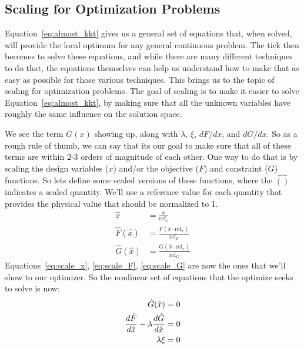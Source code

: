 \documentclass[conf]{new-aiaa}
\begin{document}
    \subsection{Scaling for Optimization Problems}

    Equation~\eqref{eq:almost_kkt} gives us a general set of equations that, when solved, will provide the local optimum for any general continuous problem. 
    The tick then becomes to solve these equations, and while there are many different techniques to do that, the equations themselves can help us understand how to make that as easy as possible for those various techniques. 
    This brings us to the topic of scaling for optimization problems. 
    The goal of {}scaling is to make it easier to solve Equation~\eqref{eq:almost_kkt}, by making sure that all the unknown variables have roughly the same influence on the solution space. 

    We see the term $G(x)$ showing up, along with $\lambda$, $\xi$, $dF/dx$, and $dG/dx$. 
    So as a rough rule of thumb, we can say that its our goal to make sure that all of these terms are within 2-3 orders of magnitude of each other. 
    One way to do that is by scaling the design variables ($x$) and/or the objective ($F$) and constraint ($G$) functions. 
    So lets define some scaled versions of these functions, where the $\hat{()}$ indicates a scaled quantity.
    We'll use a reference value for each quantity that provides the physical value that should be normalized to 1. 
    \begin{align}
        \hat{x} &= \frac{x}{\text{ref}_x} \label{eq:scale_x}\\
        \hat{F}(\hat{x}) &= \frac{F(\hat{x} \cdot \text{ref}_x)}{\text{ref}_F} \label{eq:scale_F}\\
        \hat{G}(\hat{x}) &= \frac{G(\hat{x} \cdot \text{ref}_x)}{\text{ref}_G} \label{eq:scale_G}
    \end{align}
    Equations~\eqref{eq:scale_x}, \eqref{eq:scale_F}, \eqref{eq:scale_G} are now the ones that we'll show to our optimizer. 
    So the nonlinear set of equations that the optimize seeks to solve is now: 
    \begin{align}
        \hat{G}(\hat{x}) &= 0 \notag \\
        \frac{d\hat{F}}{d\hat{x}} - \lambda \frac{d\hat{G}}{d\hat{x}} &= 0 \notag \\
        \lambda \xi &= 0
        \label{eq:almost_kkt}
    \end{align}
\end{document}
